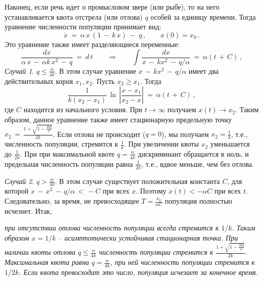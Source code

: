 \documentclass[12pt,a4paper]{article}
\begin{document}
Наконец, если речь идет о промысловом звере (или рыбе), то на него устанавливается квота отстрела (или отлова) $q$ особей за единицу времени. Тогда уравнение численности популяции принимает вид:
\begin{equation}\label{eq.popul2}
\dot x \ = \ \alpha \, x\, (1 \, - \, k\, x)\ - \ q\, , \qquad x(0) = x_0\, .
\end{equation}
Это уравнение также имеет разделяющиеся переменные:
$$
\frac{dx}{\alpha \, x \, - \, \alpha k\, x^2 \, - \, q} \ = \ d\, t \qquad  \Rightarrow \qquad
\int \frac{dx}{x \, - \, k x^2\, - \, q/\alpha} \ = \ \alpha (t\, + \, C)\, ,
$$
{\em Случай 1}. $q \le  \frac{\alpha}{4k}$. В этом случае уравнение  $x \, - \, k x^2\, - \, q/\alpha$
имеет два действительных корня $x_1, x_2$. Пусть $x_2 \ge x_1$. Тогда
\begin{equation}\label{eq.sol-popul2}
\frac{1}{k(x_2-x_1)}\, \ln \, \left|\frac{x - x_1}{x_2-x} \right|\ = \ \alpha (t\, + \, C)\, ,
\end{equation}
где $C$ находится из начального условия.  При $t\to \infty$ получаем $x(t)\to x_2$.
Таким образом, данное уравнение также имеет стационарную предельную точку
$x_2 \, = \, \frac{1 + \sqrt{1 - \frac{4kq}{\alpha}}}{2k}$. Если отлова не происходит ($q=0$), мы получаем
$x_2 = \frac1k$, т.е., численность популяции, стремится к $\frac1k$. При увеличении квоты $x_2$ уменьшается до $\frac{1}{2k}$. При при максимальной квоте
$q = \frac{\alpha}{4k}$ дискриминант обращается в ноль,  и предельная численность популяции
равна $\frac{1}{2k}$, т.е., вдвое меньше, чем без отлова.
\smallskip

{\em Случай 2}. $q > \frac{\alpha}{4k}$. В этом случае существует положительная константа $C$, для которой
$x \, - \, x^2\, - \, q/\alpha \, < \, - C$ при всех $x$. Поэтому $\dot x (t) < - \alpha C$ при всех $t$.
Следовательно, за время, не превосходящее $T = \frac{x_0}{\alpha C}$ популяция полностью исчезнет. Итак,
\smallskip

{\em при отсутствии отлова численность популяции всегда стремится к $1/k$. Таким образом $x=1/k$ -- асимптотически устойчивая стационарная точка. При наличии квоты отлова $q \le  \frac{\alpha}{4k}$ численность популяции стремится к
$\frac{1 + \sqrt{1 - \frac{4kq}{\alpha}}}{2k}$. Максимальная квота равна $q = \frac{\alpha}{4k}$, при ней
численность популяции стремится к $1/2k$. Если квота превосходит это число, популяция исчезает за конечное время.}
\medskip
\end{document}
